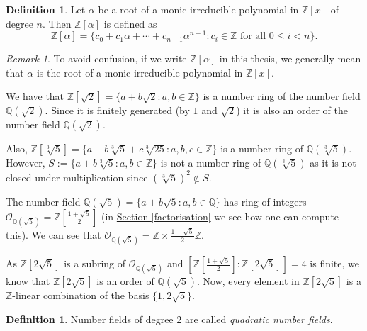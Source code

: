 \documentclass[openany, a4paper, 10pt]{book}
\theoremstyle{plain}
\theoremstyle{plain}
\theoremstyle{plain}
\theoremstyle{definition}
\newtheorem{definition}[theorem]{Definition}
\theoremstyle{plain}
\theoremstyle{definition}
\theoremstyle{remark}
\newtheorem*{remark}{Remark}
\newcommand{\secref}[1]{\hyperref[#1]{Section \ref{#1}}}
\begin{document}
\begin{definition}
    Let $\alpha$ be a root of a monic irreducible polynomial in $\mathbb Z[x]$ of degree $n$.
    Then $\mathbb Z[\alpha]$ is defined as
    \begin{equation*}
        \mathbb Z[\alpha] = \{ c_0+c_1\alpha+\cdots + c_{n-1}\alpha^{n-1}: c_i \in \mathbb Z \text{ for all } 0 \leq i < n \}.
    \end{equation*}
\end{definition}
\begin{remark}
    To avoid confusion, if we write $\mathbb Z[\alpha]$ in this thesis, we generally mean that $\alpha$ is the root of a monic irreducible polynomial in $\mathbb Z[x]$.
\end{remark}


\begin{examplebox}
    We have that $\mathbb Z[\sqrt 2]=\{ a+b\sqrt{2}: a,b\in \mathbb Z \}$ is a number ring of the number field $\mathbb Q(\sqrt 2)$.
    Since it is finitely generated (by $1$ and $\sqrt{2}$) it is also an order of the number field $\mathbb Q(\sqrt 2)$.

    Also, $\mathbb Z[\sqrt[3]{5}]=\{ a + b\sqrt[3]{5} + c\sqrt[3]{25}: a, b, c \in \mathbb Z \}$ is a number ring of $\mathbb Q(\sqrt[3]{5})$.
    However, $S := \{ a + b\sqrt[3]{5}: a, b \in \mathbb Z \}$ is not a number ring of $\mathbb Q(\sqrt[3]{5})$ as it is not closed under multiplication since $(\sqrt[3]{5})^2 \notin S$.

    \tcbline

    The number field $\mathbb Q(\sqrt{5}) = \{ a + b\sqrt{5}: a,b \in \mathbb Q\}$ has ring of integers $\mathcal O_{\mathbb Q(\sqrt{5})} = \mathbb Z[\frac{1+\sqrt{5}}{2}]$ (in \secref{factorisation} we see how one can compute this).
    We can see that $\mathcal O_{\mathbb Q(\sqrt 5)} = \mathbb Z \times \frac{1+\sqrt{5}}{2}\mathbb Z$.

    As $\mathbb Z[2\sqrt{5}]$ is a subring of $\mathcal O_{\mathbb Q(\sqrt{5})}$ and $\left[\mathbb Z[\frac{1+\sqrt{5}}{2}]: \mathbb Z[2\sqrt{5}]\right]=4$ is finite, we know that $\mathbb Z[2\sqrt{5}]$ is an order of $\mathbb Q(\sqrt{5})$.
    Now, every element in $\mathbb Z[2\sqrt{5}]$ is a $\mathbb Z$-linear combination of the basis $\{1, 2\sqrt{5}\}$.
\end{examplebox}

\begin{definition}
    Number fields of degree $2$ are called \textit{quadratic number fields}.
\end{definition}
\end{document}
